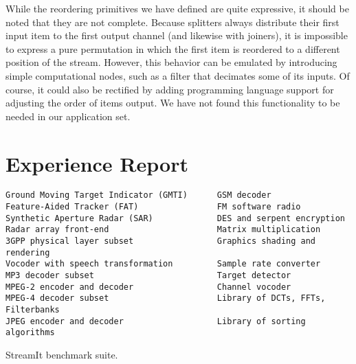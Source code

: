 While the reordering primitives we have defined are quite expressive,
it should be noted that they are not complete.  Because splitters
always distribute their first input item to the first output channel
(and likewise with joiners), it is impossible to express a pure
permutation in which the first item is reordered to a different
position of the stream.  However, this behavior can be emulated by
introducing simple computational nodes, such as a filter that
decimates some of its inputs.  Of course, it could also be rectified
by adding programming language support for adjusting the order of
items output.  We have not found this functionality to be needed in
our application set.


\section{Experience Report}
\label{sec:lang-experience}

\begin{table}[t]
\centering
{\small
\begin{verbatim}
Ground Moving Target Indicator (GMTI)      GSM decoder                       
Feature-Aided Tracker (FAT)                FM software radio                 
Synthetic Aperture Radar (SAR)             DES and serpent encryption        
Radar array front-end                      Matrix multiplication             
3GPP physical layer subset                 Graphics shading and rendering    
Vocoder with speech transformation         Sample rate converter             
MP3 decoder subset                         Target detector                   
MPEG-2 encoder and decoder                 Channel vocoder                   
MPEG-4 decoder subset                      Library of DCTs, FFTs, Filterbanks
JPEG encoder and decoder                   Library of sorting algorithms     
\end{verbatim}}
\caption{StreamIt benchmark suite.\protect\label{tab:lang-benchmarks}}
\end{table}


